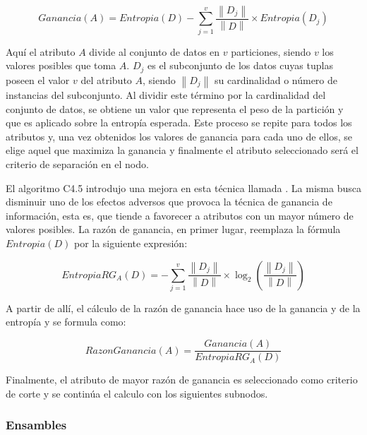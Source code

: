 \begin{equation}
	Ganancia(A) = Entropia(D)
	- \sum_{j=1}^{v} \frac{\left\| D_{j} \right\|}{\left\| D \right\|}
	\times Entropia(D_{j})
\end{equation}

Aquí el atributo $A$ divide al conjunto de datos en $v$ particiones, siendo $v$
los valores posibles que toma $A$. $D_{j}$ es el subconjunto de los datos cuyas
tuplas poseen el valor $v$ del atributo $A$, siendo $\left\|D_{j}\right\|$ su
cardinalidad o número de instancias del subconjunto. Al dividir este término por
la cardinalidad del conjunto de datos, se obtiene un valor que representa el
peso de la partición y que es aplicado sobre la entropía esperada. Este proceso
se repite para todos los atributos y, una vez obtenidos los valores de ganancia
para cada uno de ellos, se elige aquel que maximiza la ganancia y finalmente el
atributo seleccionado será el criterio de separación en el nodo.

El algoritmo C4.5 introdujo una mejora en esta técnica llamada . La misma busca disminuir uno de los efectos adversos que provoca
la técnica de ganancia de información, esta es, que tiende a favorecer a
atributos con un mayor número de valores posibles. La razón de ganancia, en
primer lugar, reemplaza la fórmula $Entropia(D)$ por la siguiente expresión:

\begin{equation}
	EntropiaRG_{A}(D) = - \sum_{j=1}^{v} \frac{\left\| D_{j} \right\|}{\left\| D \right\|}
	\times \log_{2}(\frac{\left\| D_{j} \right\|}{\left\| D \right\|})
\end{equation}

A partir de allí, el cálculo de la razón de ganancia hace uso de la ganancia y
de la entropía y se formula como:

\begin{equation} \label{eq:gan_c45}
	RazonGanancia(A) = \frac{Ganancia(A)}{EntropiaRG_{A}(D)}
\end{equation}

Finalmente, el atributo de mayor razón de ganancia es seleccionado como criterio
de corte y se continúa el calculo con los siguientes subnodos.


\subsubsection{Ensambles} 

